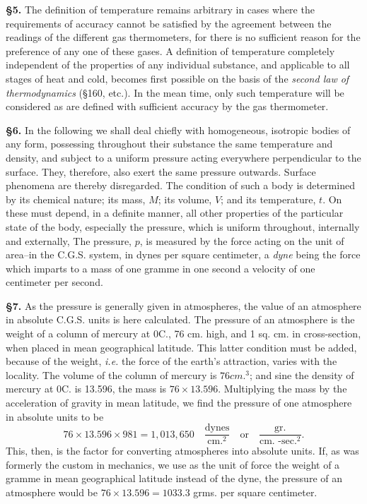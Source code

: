 \documentclass[oneside,12pt]{book}
\begin{document}
\textbf{\S 5.} The definition of temperature remains arbitrary in cases where the requirements of accuracy cannot be satisfied by the agreement between the readings of the different gas thermometers, for there is no sufficient reason for the preference of any one of these gases. A definition of temperature completely independent of the properties of any individual substance, and applicable to all stages of heat and cold, becomes first possible on the basis of the \textit{second law of thermodynamics} (\S 160, etc.). In the mean time, only such temperature will be considered as are defined with sufficient accuracy by the gas thermometer. \par 

\textbf{\S 6.} In the following we shall deal chiefly with homogeneous, isotropic bodies of any form, possessing throughout their substance the same temperature and density, and subject to a uniform pressure acting everywhere perpendicular to the surface. They, therefore, also exert the same pressure outwards. Surface phenomena are thereby disregarded. The condition of such a body is determined by its chemical nature; its mass, $M$; its volume, $V$; and its temperature, $t$. On these must depend, in a definite manner, all other properties of the particular state of the body, especially the pressure, which is uniform throughout, internally and externally, The pressure, $p$, is measured by the force acting on the unit of area--in the C.G.S. system, in dynes per square centimeter, a \textit{dyne} being the force which imparts to a mass of one gramme in one second a velocity of one centimeter per second. \par 

\textbf{\S 7.} As the pressure is generally given in atmospheres, the value of an atmosphere in absolute C.G.S. units is here calculated. The pressure of an atmosphere is the weight of a column of mercury at 0\textdegree C., 76 cm. high, and 1 sq. cm. in cross-section, when placed in mean geographical latitude. This latter condition must be added, because of the weight, \textit{i.e.} the force of the earth's attraction, varies with the locality. The volume of the column of mercury is $76 cm.^3$; and sine the density of mercury at 0\textdegree C. is 13.596, the mass is $76 \times 13.596$. Multiplying the mass by the acceleration of gravity in mean latitude, we find the pressure of one atmosphere in absolute units to be 
$$76 \times 13.596 \times 981 = 1,013,650\quad\frac{\text{dynes}}{\text{cm.}^2}\quad \text{or} \quad \frac{\text{gr.}}{\text{cm. -sec.}^2}.$$
This, then, is the factor for converting atmospheres into absolute units. If, as was formerly the custom in mechanics, we use as the unit of force the weight of a gramme in mean geographical latitude instead of the dyne, the pressure of an atmosphere would be $76 \times 13.596 = 1033.3$ grms. per square centimeter. \par 
\end{document}
